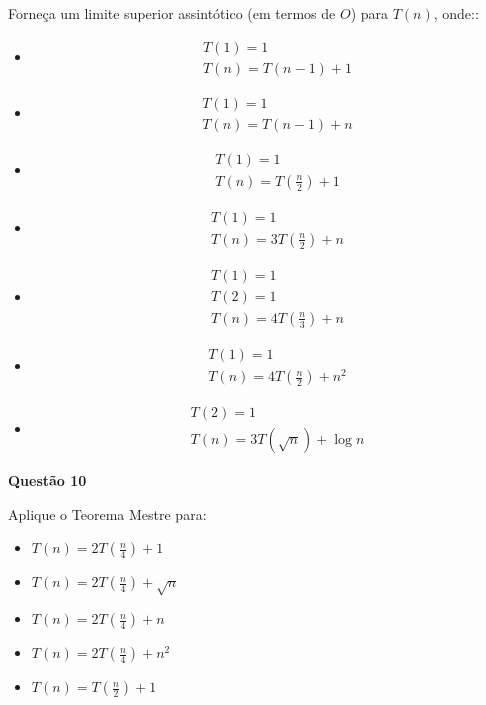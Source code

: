\documentclass[]{article}
\begin{document}
Forneça um limite superior assintótico (em termos de $O$) para $T(n)$, onde::
\begin{itemize}
  \item
    \begin{align*}
      &T(1) = 1 \\
      &T(n) = T(n - 1) + 1
    \end{align*}
  \item
    \begin{align*}
      &T(1) = 1 \\
      &T(n) = T(n - 1) + n
    \end{align*}
  \item
    \begin{align*}
      &T(1) = 1 \\
      &T(n) = T(\frac{n}{2}) + 1
    \end{align*}
  \item
    \begin{align*}
      &T(1) = 1 \\
      &T(n) = 3T(\frac{n}{2}) + n
    \end{align*}
  \item
    \begin{align*}
      &T(1) = 1 \\
      &T(2) = 1 \\
      &T(n) = 4T(\frac{n}{3}) + n
    \end{align*}
  \item
    \begin{align*}
      &T(1) = 1 \\
      &T(n) = 4T(\frac{n}{2}) + n^2
    \end{align*}
  \item
    \begin{align*}
      &T(2) = 1 \\
      &T(n) = 3T(\sqrt{n}) + \log n
    \end{align*}
\end{itemize}

\vspace{\baselineskip}

\textbf{Questão 10}

Aplique o Teorema Mestre para:
\begin{itemize}
  \item $T(n) = 2T(\frac{n}{4}) + 1$
  \item $T(n) = 2T(\frac{n}{4}) + \sqrt{n}$
  \item $T(n) = 2T(\frac{n}{4}) + n$
  \item $T(n) = 2T(\frac{n}{4}) + n^2$
  \item $T(n) = T(\frac{n}{2}) + 1$
\end{itemize}
\end{document}

